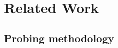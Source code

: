 \documentclass[11pt]{article}
\begin{document}
%
%
%

\section{Related Work}
\label{sec:related}
\subsection{Probing methodology}
\end{document}
